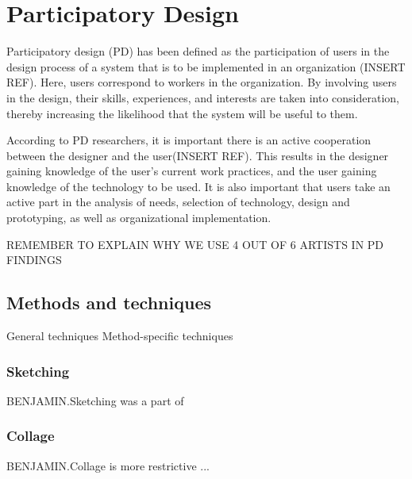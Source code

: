 \section{Participatory Design}
Participatory design (PD) has been defined as the participation of users in the design process of a system that is to be implemented in an organization (INSERT REF). Here, users correspond to workers in the organization. By involving users in the design, their skills, experiences, and interests are taken into consideration, thereby increasing the likelihood that the system will be useful to them.

According to PD researchers, it is important there is an active cooperation between the designer and the user(INSERT REF). This results in the designer gaining knowledge of the user's current work practices, and the user gaining knowledge of the technology to be used. It is also important that users take an active part in the analysis of needs, selection of technology, design and prototyping, as well as organizational implementation.

REMEMBER TO EXPLAIN WHY WE USE 4 OUT OF 6 ARTISTS IN PD FINDINGS

\subsection{Methods and techniques}
General techniques
Method-specific techniques

\subsubsection{Sketching}
BENJAMIN.Sketching was a part of

\subsubsection{Collage}
BENJAMIN.Collage is more restrictive ...